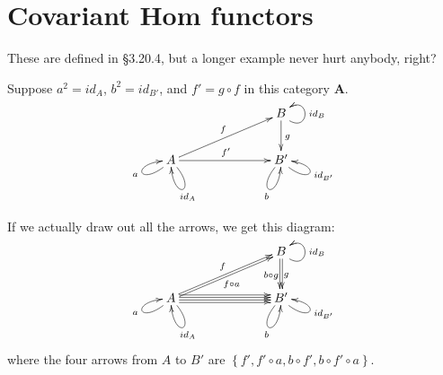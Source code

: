 \documentclass[10pt,letterpaper]{article}
\newcommand{\set}[1]{\left\{#1\right\}}
\begin{document}
\section{Covariant Hom functors}

These are defined in \S3.20.4, but a longer example never hurt anybody, right?

Suppose $a^2 = id_A$, $b^2 = id_{B'}$, and $f' = g \circ f$ in this category $\mathbf{A}$.
\[ \xymatrix@C=1in{
                                                           & B \ar[d]^g \ar@(dr,ur)_{id_B} \\
  A \ar@(dr,d)^{id_A} \ar@(dl,l)^{a} \ar[ru]^f \ar[r]^{f'} & B' \ar@(dl,d)_{b} \ar@(dr,r)_{id_{B'}} \\
  } \]

If we actually draw out all the arrows, we get this diagram:
\[ \xymatrix@C=1in{
     & B \ar@<1pt>[d]_{b \circ g} \ar@<-1pt>[d]^g  \ar@(dr,ur)_{id_B} \\
  A \ar@(dr,d)^{id_A} \ar@(dl,l)^{a}
    \ar@<1pt>[ru]^f \ar@<-1pt>[ru]_{f \circ a}
    \ar@<3pt>[r] \ar@<1pt>[r] \ar@<-1pt>[r] \ar@<-3pt>[r]
     & B' \ar@(dl,d)_{b} \ar@(dr,r)_{id_{B'}} \\
  } \]
where the four arrows from $A$ to $B'$ are $\set{f', f' \circ a, b \circ f', b \circ f' \circ a}$.
\end{document}
